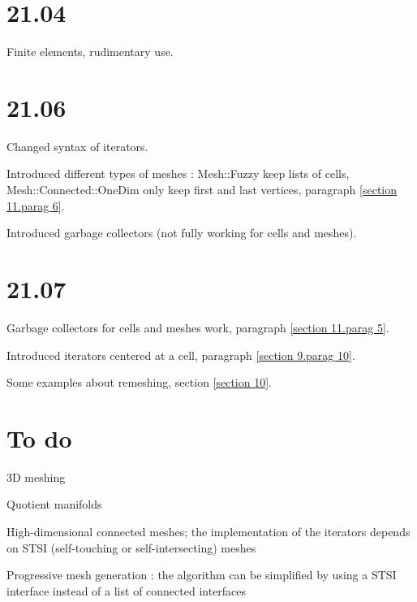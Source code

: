 \documentclass[a4paper]{scrreprt}
\def\numb{}
\newcommand\verm[1]{\textcolor{manif}{#1}}
\renewcommand\tt{\normalfont\ttfamily}
\begin{document}



\section*{21.04}

\noindent Finite elements, rudimentary use.


\section*{21.06}

\noindent Changed syntax of iterators.

\noindent Introduced different types of meshes :
{\small\tt\verm{Mesh}::Fuzzy} keep lists of cells,
{\small\tt\verm{Mesh}::Connected::OneDim} only keep first and last vertices,
paragraph \ref{\numb section 11.\numb parag 6}.

\noindent Introduced garbage collectors (not fully working for cells and meshes).


\section*{21.07}

\noindent Garbage collectors for cells and meshes work,
paragraph \ref{\numb section 11.\numb parag 5}.

\noindent Introduced iterators centered at a cell,
paragraph \ref{\numb section 9.\numb parag 10}.

\noindent Some examples about remeshing, section \ref{\numb section 10}.


\section*{To do}

\noindent 3D meshing

\noindent Quotient manifolds

\noindent High-dimensional connected meshes; the implementation of the iterators depends
on STSI (self-touching or self-intersecting) meshes

\noindent Progressive mesh generation : the algorithm can be simplified by using
a STSI interface instead of a list of connected interfaces


\end{document}

